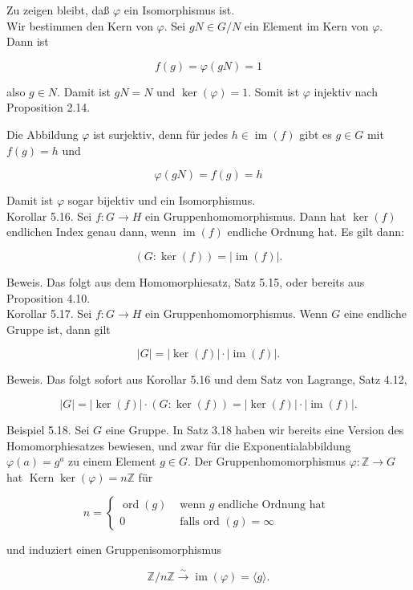 \documentclass[10pt, letterpaper]{article}
\begin{document}
Zu zeigen bleibt, daß $\varphi$ ein Isomorphismus ist.\\
Wir bestimmen den Kern von $\varphi$. Sei $g N \in G / N$ ein Element im Kern von $\varphi$. Dann ist

$$
f(g)=\varphi(g N)=1
$$

also $g \in N$. Damit ist $g N=N$ und $\operatorname{ker}(\varphi)=1$. Somit ist $\varphi$ injektiv nach Proposition 2.14.

Die Abbildung $\varphi$ ist surjektiv, denn für jedes $h \in \operatorname{im}(f)$ gibt es $g \in G$ mit $f(g)=h$ und

$$
\varphi(g N)=f(g)=h
$$

Damit ist $\varphi$ sogar bijektiv und ein Isomorphismus.\\
Korollar 5.16. Sei $f: G \rightarrow H$ ein Gruppenhomomorphismus. Dann hat $\operatorname{ker}(f)$ endlichen Index genau dann, wenn $\operatorname{im}(f)$ endliche Ordnung hat. Es gilt dann:

$$
(G: \operatorname{ker}(f))=|\operatorname{im}(f)| .
$$

Beweis. Das folgt aus dem Homomorphiesatz, Satz 5.15, oder bereits aus Proposition 4.10.\\
Korollar 5.17. Sei $f: G \rightarrow H$ ein Gruppenhomomorphismus. Wenn $G$ eine endliche Gruppe ist, dann gilt

$$
|G|=|\operatorname{ker}(f)| \cdot|\operatorname{im}(f)| .
$$

Beweis. Das folgt sofort aus Korollar 5.16 und dem Satz von Lagrange, Satz 4.12,

$$
|G|=|\operatorname{ker}(f)| \cdot(G: \operatorname{ker}(f))=|\operatorname{ker}(f)| \cdot|\operatorname{im}(f)| .
$$

Beispiel 5.18. Sei $G$ eine Gruppe. In Satz 3.18 haben wir bereits eine Version des Homomorphiesatzes bewiesen, und zwar für die Exponentialabbildung $\varphi(a)=g^{a}$ zu einem Element $g \in G$. Der Gruppenhomomorphismus $\varphi: \mathbb{Z} \rightarrow G$ hat $\operatorname{Kern} \operatorname{ker}(\varphi)=n \mathbb{Z}$ für

$$
n= \begin{cases}\operatorname{ord}(g) & \text { wenn } g \text { endliche Ordnung hat } \\ 0 & \text { falls ord }(g)=\infty\end{cases}
$$

und induziert einen Gruppenisomorphismus

$$
\mathbb{Z} / n \mathbb{Z} \xrightarrow{\sim} \operatorname{im}(\varphi)=\langle g\rangle .
$$
\end{document}
